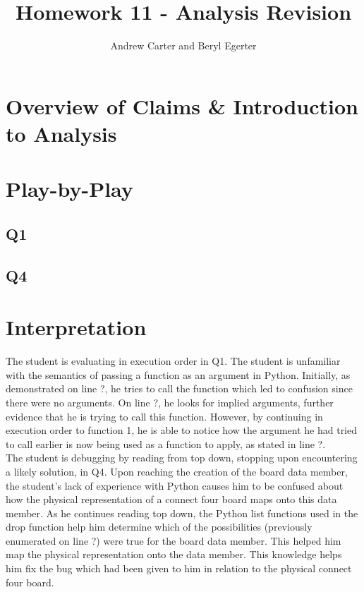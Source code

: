 \documentclass{article}
\title{Homework 11 - Analysis Revision}
\author{Andrew Carter and Beryl Egerter}
\begin{document}
\maketitle
\section{Overview of Claims \& Introduction to Analysis}

\section{Play-by-Play}
\subsection{Q1}
\subsection{Q4}

\section{Interpretation}

The student is evaluating in execution order in Q1. The student is unfamiliar with the semantics of passing a function as an argument in Python. Initially, as demonstrated on line ?, he tries to call the function which led to confusion since there were no arguments. On line ?, he looks for implied arguments, further evidence that he is trying to call this function. However, by continuing in execution order to function 1, he is able to notice how the argument he had tried to call earlier is now being used as a function to apply, as stated in line ?.  \\

The student is debugging by reading from top down, stopping upon encountering a likely solution, in Q4. Upon reaching the creation of the board data member, the student's lack of experience with Python causes him to be confused about how the physical representation of a connect four board maps onto this data member. As he continues reading top down, the Python list functions used in the drop function help him determine which of the possibilities (previously enumerated on line ?) were true for the board data member. This helped him map the physical representation onto the data member. This knowledge helps him fix the bug which had been given to him in relation to the physical connect four board.  \\
\end{document}
